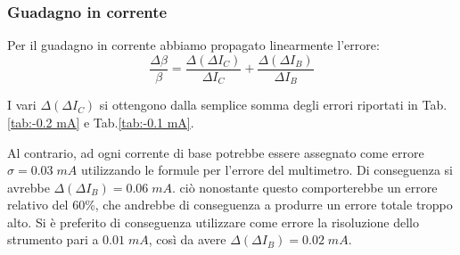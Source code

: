 \documentclass[a4paper, 11pt]{article}
\begin{document}
\subsubsection{Guadagno in corrente} \label{sec:errori-beta}
Per il guadagno in corrente abbiamo propagato linearmente l'errore:
\begin{equation*}
    \frac{\Delta \beta}{\beta} = \frac{\Delta(\Delta I_C)}{\Delta I_C} +\frac{\Delta(\Delta I_B)}{\Delta I_B}
\end{equation*}

I vari $\Delta(\Delta I_C)$ si ottengono dalla semplice somma degli errori riportati in Tab.\ref{tab:-0.2 mA} e Tab.\ref{tab:-0.1 mA}.

Al contrario, ad ogni corrente di base potrebbe essere assegnato come errore $\sigma = 0.03 \;mA$ utilizzando le formule per l'errore del multimetro. Di conseguenza si avrebbe $\Delta(\Delta I_B) = 0.06 \; mA$. ciò nonostante questo comporterebbe un errore relativo del 60\%, che andrebbe di conseguenza a produrre un errore totale troppo alto. Si è preferito di conseguenza utilizzare come errore la risoluzione dello strumento pari a $0.01 \;mA$, così da avere $\Delta(\Delta I_B) = 0.02 \; mA$.
\end{document}
